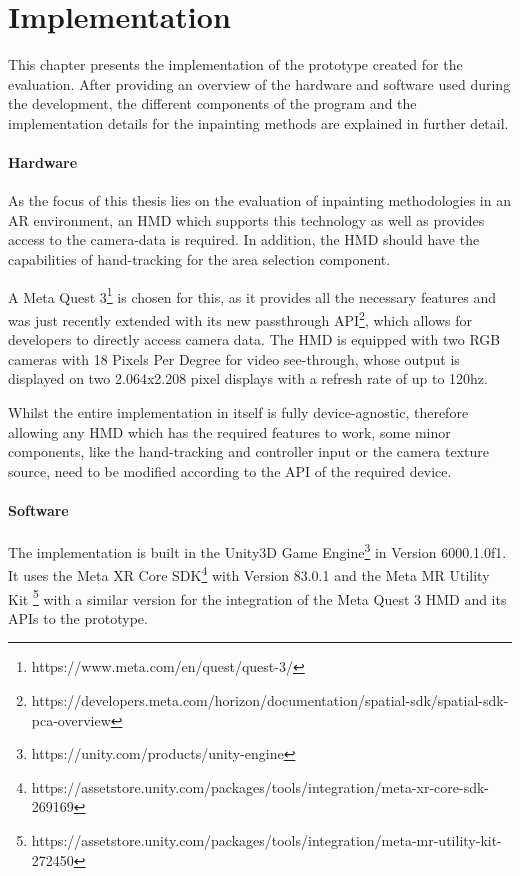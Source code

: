 \chapter{Implementation}
\label{cha:Implementation}

This chapter presents the implementation of the prototype created for the evaluation.
After providing an overview of the hardware and software used during the development, the different components of the program and the implementation details for the inpainting methods are explained in further detail.

\subsubsection{Hardware}

As the focus of this thesis lies on the evaluation of inpainting methodologies in an AR environment, an HMD which supports this technology
as well as provides access to the camera-data is required. In addition, the HMD should have the capabilities of hand-tracking for the area selection component.

A Meta Quest 3\footnote{https://www.meta.com/en/quest/quest-3/} is chosen for this, as it provides all the necessary features and was just recently extended with its new passthrough API\footnote{https://developers.meta.com/horizon/documentation/spatial-sdk/spatial-sdk-pca-overview}, which allows
for developers to directly access camera data. The HMD is equipped with two RGB cameras with 18 Pixels Per Degree for video see-through, whose output is displayed on two 2.064x2.208 pixel displays with a refresh rate of up to 120hz.

Whilst the entire implementation in itself is fully device-agnostic, therefore allowing any HMD which has the required features to work, some minor components, like the hand-tracking and controller input or the camera texture source, need to be modified according to the API of the required device.

\subsubsection{Software}
The implementation is built in the Unity3D Game Engine\footnote{https://unity.com/products/unity-engine} in Version 6000.1.0f1.
\\
It uses the Meta XR Core SDK\footnote{https://assetstore.unity.com/packages/tools/integration/meta-xr-core-sdk-269169} with Version 83.0.1 and the Meta MR Utility Kit \footnote{https://assetstore.unity.com/packages/tools/integration/meta-mr-utility-kit-272450} with a similar version for the integration of the Meta Quest 3 HMD and its APIs to the prototype.

